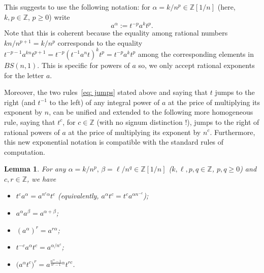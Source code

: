 \documentclass[english]{amsart}
\newtheorem{lem}[thm]{Lemma}
\theoremstyle{definition}
\newcommand\ZZ{\mathbb{Z}}
\begin{document}
This suggests to use the following notation: for $\alpha =k/n^p\in \ZZ[1/n]$ (here, $k,p\in \ZZ$, $p\geq 0$) write 
 $$
a^{\alpha}:=t^{-p}a^k t^p.
 $$
Note that this is coherent because the equality among rational numbers $kn/n^{p+1} =k/n^p$ corresponds to the equality $t^{-p-1}a^{kn} t^{p+1}=t^{-p} (t^{-1}a^n t)^k t^p=t^{-p}a^k t^p$ among the corresponding elements in $BS(n,1)$. This is specific for powers of $a$ so, we only accept rational exponents for the letter $a$. 

Moreover, the two rules~\eqref{eq: jumps} stated above and saying that $t$ jumps to the right (and $t^{-1}$ to the left) of any integral power of $a$ at the price of multiplying its exponent by $n$, 
can be unified and extended to the following more homogeneous rule, saying that $t^c$, for $c\in \ZZ$ (with no signum distinction !), jumps to the right of rational powers of $a$ at the price of multiplying its exponent by $n^c$. Furthermore, this new exponential notation is compatible with the standard rules of computation. 

\begin{lem}\label{lem: calculs}
For any $\alpha =k/n^p,\, \beta=\ell/n^q\in \ZZ[1/n]$ ($k,\ell, p,q\in \ZZ$, $p,q\geq 0$) and $c, r\in \ZZ$, we have 
\begin{itemize}
\item[(i)] $t^c a^{\alpha} =a^{n^c \alpha} t^c$ (equivalently, $a^{\alpha} t^c= t^c a^{\alpha n^{-c}}$);
\item[(ii)] $a^{\alpha}a^{\beta}=a^{\alpha+\beta}$;
\item[(iii)] $(a^{\alpha})^r =a^{r\alpha}$;
\item[(iv)] $t^{-c}a^{\alpha}t^c=a^{\alpha/n^c}$;
\item[(v)] $\big( a^{\alpha}t^c \big)^r = a^{\frac{n^{rc}-1}{n^c-1}\alpha} t^{rc}$.
\end{itemize}
\end{lem}
\end{document}
